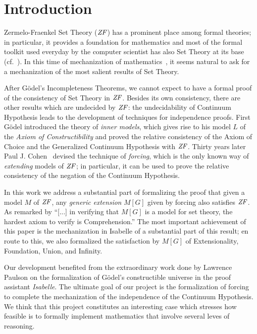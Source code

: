 \section{Introduction}
Zermelo-Fraenkel Set Theory ($\mathit{ZF}$) has a prominent place among formal
theories; in particular, it provides a foundation for mathematics and
most of the formal toolkit used everyday by the computer scientist has
also Set Theory at its base (cf.~\cite{paulson1995set}). In this time
of mechanization of mathematics~\cite{avigad2018mechanization}, it
seems natural to ask for a mechanization of the most salient results
of Set Theory.

After G\"odel's Incompleteness Theorems, we cannot expect to have a
formal proof of the consistency of Set Theory in $\mathit{ZF}$. Besides its own
consistency, there are other results which are undecided by $\mathit{ZF}$: the
undecidability of Continuum Hypothesis leads to the development of
techniques for independence proofs. First G\"odel introduced the
theory of \emph{inner models}, which gives rise to his model $L$ of
the \emph{Axiom of Constructibility} \cite{godel-L} and proved the
relative consistency of the Axiom of Choice and the Generalized
Continuum Hypothesis with $\mathit{ZF}$. Thirty years later Paul
J. Cohen~\cite{Cohen-CH-PNAS} devised the technique of \emph{forcing},
which is the only known way of \emph{extending} models of $\mathit{ZF}$; in
particular, it can be used to prove the relative consistency of the
negation of the Continuum Hypothesis. 

In this work we address a substantial part of formalizing the proof
that given a model $M$ of $\mathit{ZF}$, any \emph{generic extension} $M[G]$
given by forcing also satisfies $\mathit{ZF}$. As remarked by
\citet[][p.250]{kunen2011set} \enquote{[...] in verifying that $M[G]$
  is a model for set theory, the hardest axiom to verify is
  Comprehension.}  The most important achievement of this paper is the
mechanization in Isabelle of a substantial part of this result; en
route to this, we also formalized the satisfaction by $M[G]$ of
Extensionality, Foundation, Union, and Infinity. 

Our development benefited from the extraordinary work done by Lawrence
Paulson \cite{paulson_2003} on the formalization of G\"odel's
constructible universe in the proof assistant \emph{Isabelle}. The
ultimate goal of our project is the formalization of forcing to
complete the mechanization of the independence of the Continuum
Hypothesis. We think that this project constitutes an interesting case
which stresses how feasible is to formally implement mathematics that
involve several leves of reasoning.

